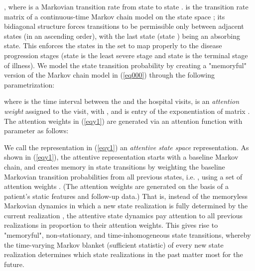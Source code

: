 \documentclass[twoside,11pt]{article}
\begin{document}
\mbox{\footnotesize }, where \mbox{\footnotesize } is a Markovian transition rate from state \mbox{\footnotesize } to state \mbox{\footnotesize }. \mbox{\footnotesize } is the transition rate matrix of a continuous-time Markov chain model on the state space \mbox{\footnotesize }; its bidiagonal structure forces transitions to be permissible only between adjacent states (in an ascending order), with the last state (state \mbox{\footnotesize }) being an absorbing state. This enforces the states in the set \mbox{\footnotesize } to map properly to the disease progression stages (state \mbox{\footnotesize } is the least severe stage and state \mbox{\footnotesize } is the terminal stage of illness). We model the state transition probability \mbox{\footnotesize } by creating a "memoryful" version of the Markov chain model in (\ref{eq000}) through the following parametrization: 

where \mbox{\footnotesize } is the time interval between the \mbox{\footnotesize } and the \mbox{\footnotesize } hospital visits, \mbox{\footnotesize } is an {\it attention weight} assigned to the \mbox{\footnotesize } visit, with \mbox{\footnotesize }, and \mbox{\footnotesize } is entry \mbox{\footnotesize } of the exponentiation of matrix \mbox{\footnotesize }. The attention weights in (\ref{eqy1}) are generated via an attention function \mbox{\footnotesize } with parameter \mbox{\footnotesize } as follows:
  
We call the representation in (\ref{eqy1}) an {\it attentive state space} representation. As shown in (\ref{eqy1}), the attentive representation starts with a baseline Markov chain, and creates memory in state transitions by weighting the baseline Markovian transition probabilities from all previous states, i.e. \mbox{\footnotesize }, using a set of attention weights \mbox{\footnotesize }. (The attention weights are generated on the basis of a patient's static features and follow-up data.) That is, instead of the memoryless Markovian dynamics in which a new state realization \mbox{\footnotesize } is fully determined by the current realization \mbox{\footnotesize }, the attentive state dynamics pay attention to all previous realizations in proportion to their attention weights. This gives rise to "memoryful", non-stationary, and time-inhomogeneous state transitions, whereby the time-varying Markov blanket (sufficient statistic) \mbox{\footnotesize } of every new state realization \mbox{\footnotesize } determines which state realizations in the past matter most for the future.  
\end{document}
